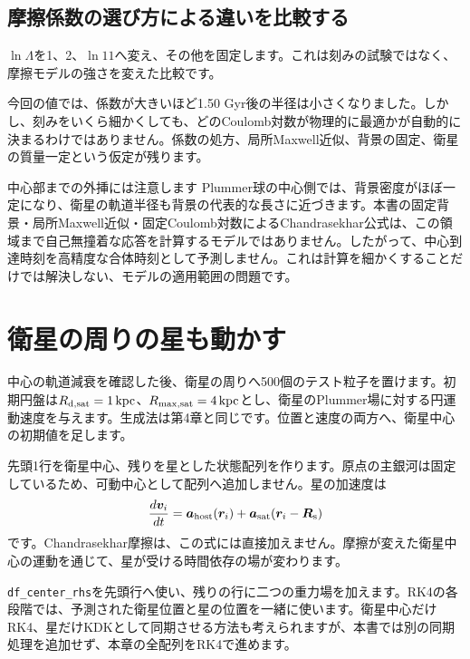 \subsection{摩擦係数の選び方による違いを比較する}
$\ln\Lambda$を1、2、$\ln11$へ変え、その他を固定します。これは刻みの試験ではなく、摩擦モデルの強さを変えた比較です。
\begin{table}[htbp]\centering\small
\caption{固定Coulomb対数を変更した中心軌道。初期半径、初期速度、主銀河、衛星質量、RK4の刻み1 Myrは共通です。}\label{tab:ch7-lambda}

\end{table}

今回の値では、係数が大きいほど1.50 Gyr後の半径は小さくなりました。しかし、刻みをいくら細かくしても、どのCoulomb対数が物理的に最適かが自動的に決まるわけではありません。係数の処方、局所Maxwell近似、背景の固定、衛星の質量一定という仮定が残ります。

\begin{notebox}{中心部までの外挿には注意します}
Plummer球の中心側では、背景密度がほぼ一定になり、衛星の軌道半径も背景の代表的な長さに近づきます。本書の固定背景・局所Maxwell近似・固定Coulomb対数によるChandrasekhar公式は、この領域まで自己無撞着な応答を計算するモデルではありません。したがって、中心到達時刻を高精度な合体時刻として予測しません。これは計算を細かくすることだけでは解決しない、モデルの適用範囲の問題です。
\end{notebox}

\section{衛星の周りの星も動かす}
\label{sec:ch7-df-tracers}
中心の軌道減衰を確認した後、衛星の周りへ500個のテスト粒子を置けます。初期円盤は$R_{\rm d,sat}=1\,\mathrm{kpc}$、$R_{\max,\rm sat}=4\,\mathrm{kpc}$とし、衛星のPlummer場に対する円運動速度を与えます。生成法は第4章と同じです。位置と速度の両方へ、衛星中心の初期値を足します。

先頭1行を衛星中心、残りを星とした状態配列を作ります。原点の主銀河は固定しているため、可動中心として配列へ追加しません。星の加速度は
\begin{equation}
 \frac{d\boldsymbol v_i}{dt}=\boldsymbol a_{\rm host}(\boldsymbol r_i)
 +\boldsymbol a_{\rm sat}(\boldsymbol r_i-\boldsymbol R_{\rm s})
 \label{eq:ch7-tracer-force}
\end{equation}
です。Chandrasekhar摩擦は、この式には直接加えません。摩擦が変えた衛星中心の運動を通じて、星が受ける時間依存の場が変わります。

\texttt{df\_center\_rhs}を先頭行へ使い、残りの行に二つの重力場を加えます。RK4の各段階では、予測された衛星位置と星の位置を一緒に使います。衛星中心だけRK4、星だけKDKとして同期させる方法も考えられますが、本書では別の同期処理を追加せず、本章の全配列をRK4で進めます。

